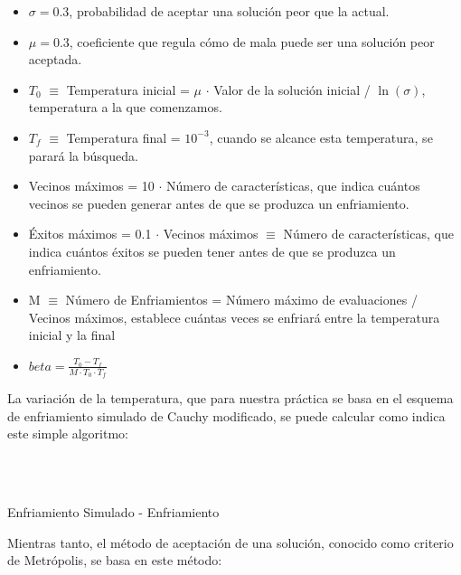 \documentclass[a4paper, 11pt]{article}
\begin{document}
			\begin{itemize}
				\item $\sigma = 0.3$, probabilidad de aceptar una solución peor que la actual.
				\item $\mu = 0.3$, coeficiente que regula cómo de mala puede ser una solución peor
				aceptada.
				\item $T_0$ $\equiv$ Temperatura inicial = $\mu$ $\cdot$ Valor de la solución inicial / $\ln(\sigma)$,
				temperatura a la que comenzamos.
				\item $T_f$ $ \equiv$ Temperatura final = $10^{-3}$, cuando se alcance esta temperatura, se parará la
				búsqueda.
				\item Vecinos máximos = 10 $\cdot$ Número de características, que indica cuántos vecinos
				se pueden generar antes de que se produzca un enfriamiento.
				\item Éxitos máximos = 0.1 $\cdot$ Vecinos máximos $\equiv$ Número de características,
				que indica cuántos éxitos se pueden tener antes de que se produzca un enfriamiento.
				\item M $\equiv$ Número de Enfriamientos = Número máximo de evaluaciones / Vecinos máximos,
				establece cuántas veces se enfriará entre la temperatura inicial y la final
				\item $\displaystyle beta = \frac{T_0 - T_f}{M \cdot T_0 \cdot T_f}$
			\end{itemize}

			La variación de la temperatura, que para nuestra práctica se basa en el esquema de
			enfriamiento simulado de Cauchy modificado, se puede calcular como indica este simple
			algoritmo:
			
			\begin{algorithm}[H]
				\begin{algorithmic}[1]
					\REQUIRE \ \\
							 \
							 
				\end{algorithmic}
			\caption{Enfriamiento Simulado - Enfriamiento}
			\label{SA-Annealing}
			\end{algorithm}

			Mientras tanto, el método de aceptación de una solución, conocido como criterio de
			Metrópolis, se basa en este método:
\end{document}
